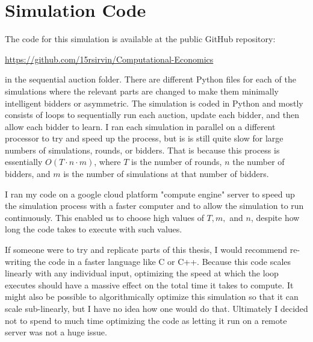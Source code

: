 \documentclass[12pt,twoside]{reedthesis}
\begin{document}
    \appendix
      \chapter{Simulation Code}
      The code for this simulation is available at the public GitHub repository:
      \begin{center}
      	\url{https://github.com/15rsirvin/Computational-Economics}
      \end{center}
      in the sequential auction folder. 
      There are different Python files for each of the simulations where the relevant parts are changed to make them minimally intelligent bidders or asymmetric. The simulation is coded in Python and mostly consists of loops to sequentially run each auction, update each bidder, and then allow each bidder to learn. I ran each simulation in parallel on a different processor to try and speed up the process, but is is still quite slow for large numbers of simulations, rounds, or bidders. That is because this process is essentially $O(T \cdot n \cdot m)$, where $T$ is the number of rounds, $n$ the number of bidders, and $m$ is the number of simulations at that number of bidders. 
      
      I ran my code on a google cloud platform "compute engine" server to speed up the simulation process with a faster computer and to allow the simulation to run continuously. This enabled us to choose high values of $T, m,$ and $n$, despite how long the code takes to execute with such values.  
      
      If someone were to try and replicate parts of this thesis, I would recommend re-writing the code in a faster language like C or C++. Because this code scales linearly with any individual input, optimizing the speed at which the loop executes should have a massive effect on the total time it takes to compute. It might also be possible to algorithmically optimize this simulation so that it can scale sub-linearly, but I have no idea how one would do that. Ultimately I decided not to spend to much time optimizing the code as letting it run on a remote server was not a huge issue.
      


  \backmatter %

    \nocite{*}
\end{document}
